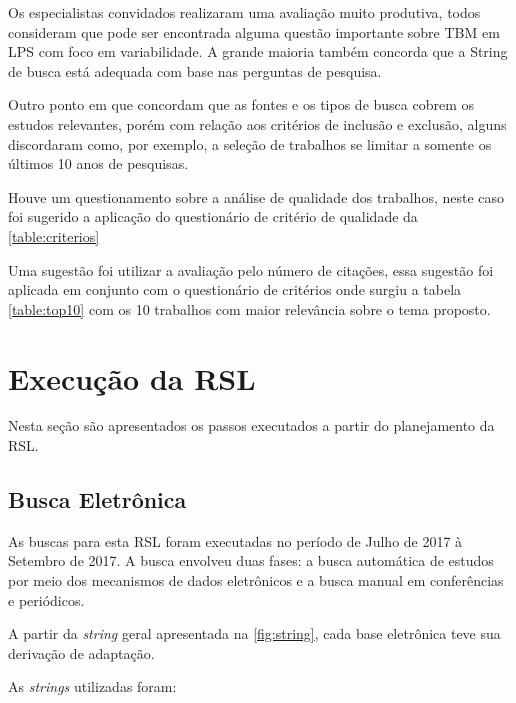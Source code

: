 Os especialistas convidados realizaram uma avaliação muito produtiva, todos consideram que pode ser encontrada alguma questão importante sobre TBM em LPS com foco em variabilidade. A grande maioria também concorda que a String de busca está adequada com base nas perguntas de pesquisa.

Outro ponto em que concordam que as fontes e os tipos de busca cobrem os estudos relevantes, porém com relação aos critérios de inclusão e exclusão, alguns discordaram como, por exemplo, a seleção de trabalhos se limitar a somente os últimos 10 anos de pesquisas.

Houve um questionamento sobre a análise de qualidade dos trabalhos, neste caso foi sugerido a aplicação do questionário de critério de qualidade da \ref{table:criterios}

Uma sugestão foi utilizar a avaliação pelo número de citações, essa sugestão foi aplicada em conjunto com o questionário de critérios onde surgiu a tabela \ref{table:top10} com os 10 trabalhos com maior relevância sobre o tema proposto.

\newpage
\section{Execução da RSL}
Nesta seção são apresentados os passos executados a partir do planejamento da RSL.
\subsection{Busca Eletrônica}
As buscas para esta RSL foram executadas no período de Julho de 2017 à Setembro de 2017. A busca envolveu duas fases: a busca automática de estudos por meio dos mecanismos de dados eletrônicos e a busca manual em conferências e periódicos.

A partir da \textit{string} geral apresentada na \ref{fig:string}, cada base eletrônica teve sua derivação de adaptação.

As \textit{strings} utilizadas foram:


